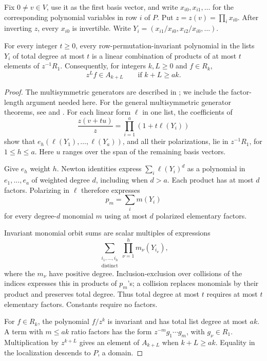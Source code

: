 Fix \(0\ne v\in V\), use it as the first basis vector, and write
\(x_{i0},x_{i1},\ldots\) for the corresponding polynomial variables in
row \(i\) of \(P\). Put \(z=z(v)=\prod_i x_{i0}\).
After inverting \(z\), every \(x_{i0}\) is invertible. Write
\(Y_i=(x_{i1}/x_{i0},x_{i2}/x_{i0},\ldots)\).

\begin{lemma}\label{lem:chart}
For every integer \(t\ge0\), every row-permutation-invariant polynomial
in the lists \(Y_i\) of total degree at most \(t\) is a linear combination of products of at
most \(t\) elements of \(z^{-1}R_1\).
Consequently, for integers \(k,L\ge0\) and \(f\in R_k\),
\[
             z^Lf\in A_{k+L}\qquad\text{if }k+L\ge ak.
\]
\end{lemma}
\begin{proof}
The multisymmetric generators are described in
\cite[Remark~2.9]{RaicuSamWeyman2022}; we include the factor-length
argument needed here.
For the general multisymmetric generator theorems, see
\cite[Theorem~1]{Vaccarino2005} and \cite[Corollary~8.4]{Rydh2007}.
For each linear form \(\ell\) in one list, the coefficients of
\[
 \frac{z(v+tu)}{z}=\prod_{i=1}^a(1+t\ell(Y_i))
\]
show that \(e_h(\ell(Y_1),\ldots,\ell(Y_a))\), and all their
polarizations, lie in \(z^{-1}R_1\), for \(1\le h\le a\).
Here \(u\) ranges over the span of the remaining basis vectors.

Give \(e_h\) weight \(h\). Newton identities express
\(\sum_i\ell(Y_i)^d\) as a polynomial in \(e_1,\ldots,e_a\)
of weighted degree \(d\), including when \(d>a\). Each product has
at most \(d\) factors. Polarizing in \(\ell\) therefore expresses
\[
                         p_m=\sum_i m(Y_i)
\]
for every degree-\(d\) monomial \(m\) using at most \(d\) polarized
elementary factors.

Invariant monomial orbit sums are scalar multiples of expressions
\[
        \sum_{\substack{i_1,\ldots,i_h\\\text{distinct}}}
                    \prod_{\nu=1}^h m_\nu(Y_{i_\nu}),
\]
where the \(m_\nu\) have positive degree. Inclusion-exclusion over
collisions of the indices expresses this in products of \(p_m\)'s;
a collision replaces monomials by their product and preserves total
degree. Thus total degree at most \(t\) requires at most \(t\) elementary
factors. Constants require no factors.

For \(f\in R_k\), the polynomial \(f/z^k\) is invariant and has total
list degree at most \(ak\). A term with \(m\le ak\) ratio factors has
the form \(z^{-m}g_1\cdots g_m\), with \(g_\nu\in R_1\).
Multiplication by \(z^{k+L}\) gives an element of \(A_{k+L}\) when
\(k+L\ge ak\). Equality in the localization descends to \(P\), a domain.
\end{proof}

